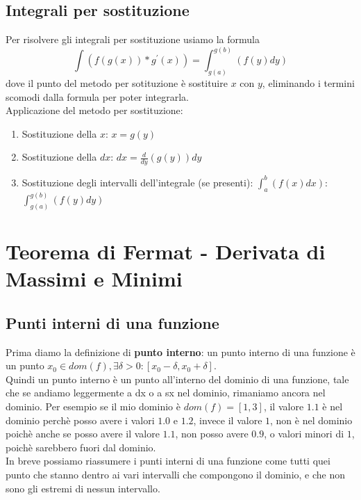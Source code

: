 \documentclass[11pt]{article}
\begin{document}
\subsection{Integrali per sostituzione}
Per risolvere gli integrali per sostituzione usiamo la formula $$\int(f(g(x))*g^{'}(x)) = \int_{g(a)}^{g(b)}(f(y)dy)$$
dove il punto del metodo per sotituzione è sostituire $x$ con $y$, eliminando i termini scomodi dalla formula per poter integrarla.\\
Applicazione del metodo per sostituzione:\\
\begin{enumerate}
    \item Sostituzione della $x$: $x = g(y)$
    \item Sostituzione della $dx$: $dx = \frac{d}{dy}(g(y))dy$
    \item Sostituzione degli intervalli dell'integrale (se presenti): $\int_{a}^{b}(f(x)dx)$: $\int_{g(a)}^{g(b)}(f(y)dy)$
\end{enumerate}
\section{Teorema di Fermat - Derivata di Massimi e Minimi}
\subsection{Punti interni di una funzione}
Prima diamo la definizione di \textbf{punto interno}: un punto interno di una funzione è 
un punto $x_{0} \in dom(f), \exists \delta > 0 : [x_{0} - \delta, x_{0} + \delta]$.\\
Quindi un punto interno è un punto all'interno del dominio di una funzione, tale che se andiamo leggermente a dx o a sx nel dominio, rimaniamo ancora 
nel dominio. Per esempio se il mio dominio è $dom(f) = [1,3]$, il valore $1.1$ è nel dominio perchè posso avere i valori $1.0$ e $1.2$, invece il valore 
$1$, non è nel dominio poichè anche se posso avere il valore $1.1$, non posso avere $0.9$, o valori minori di $1$, poichè sarebbero fuori dal dominio.\\
In breve possiamo riassumere i punti interni di una funzione come tutti quei punto che stanno dentro ai vari intervalli che compongono il dominio, e che 
non sono gli estremi di nessun intervallo.\\
\end{document}
